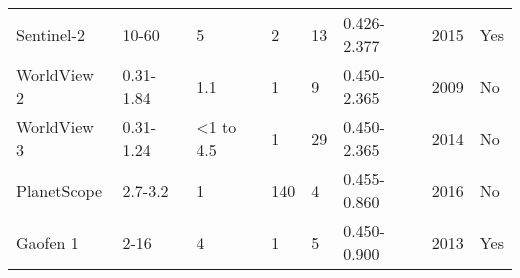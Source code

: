 \begin{table}[htb]
\begin{tabular}{@{}llllllll@{}}
    Sentinel-2 \cite{Sentinel2}    & 10-60                                                                             & 5                                                                          & 2                                                                       & 13                                                                   & 0.426-2.377                                                                    & 2015                                                           & Yes                                                            \\
    WorldView 2 \cite{WorldView2}  & 0.31-1.84                                                                         & 1.1                                                                        & 1                                                                       & 9                                                                    & 0.450-2.365                                                                    & 2009                                                           & No                                                             \\
    WorldView 3 \cite{WorldView3}  & 0.31-1.24                                                                         & <1 to 4.5                                                                  & 1                                                                       & 29                                                                   & 0.450-2.365                                                                    & 2014                                                           & No                                                             \\
    PlanetScope \cite{PlanetScope} & 2.7-3.2                                                                           & 1                                                                          & 140                                                                     & 4                                                                    & 0.455-0.860                                                                    & 2016                                                           & No                                                             \\
    Gaofen 1 \cite{Gaofen1}        & 2-16                                                                              & 4                                                                          & 1                                                                       & 5                                                                    & 0.450-0.900                                                                    & 2013                                                           & Yes                                                            \\

\end{tabular}
\end{table}
